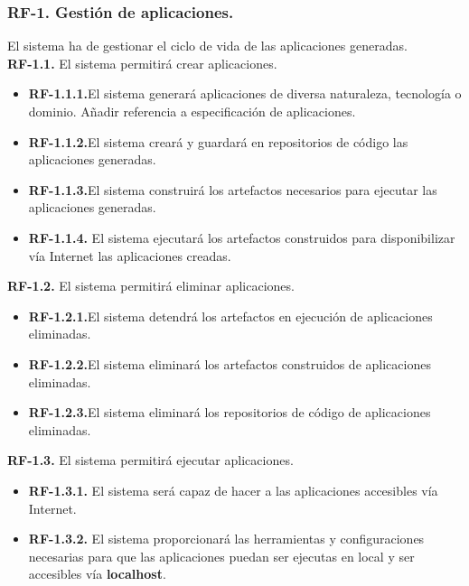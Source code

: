 \documentclass[a4paper,11pt]{book}
\begin{document}
\subsubsection { \textbf{ RF-1. Gestión de aplicaciones.}} El sistema ha de gestionar el ciclo de vida de las aplicaciones generadas.\\

\textbf{RF-1.1.} El sistema permitirá crear aplicaciones.
\begin{itemize}
 \item 	\textbf{RF-1.1.1.}El sistema generará aplicaciones de diversa naturaleza, tecnología o dominio. Añadir referencia a especificación de aplicaciones.
 \item 	\textbf{RF-1.1.2.}El sistema creará y  guardará en repositorios de código las aplicaciones generadas.
  \item \textbf{RF-1.1.3.}El sistema construirá los artefactos necesarios para ejecutar las aplicaciones generadas.
   \item  \textbf{RF-1.1.4.} El sistema ejecutará los artefactos construidos para disponibilizar vía Internet las aplicaciones creadas. \\
\end{itemize}


\textbf{RF-1.2.} El sistema permitirá eliminar aplicaciones.
\begin{itemize}
 \item 	\textbf{RF-1.2.1.}El sistema detendrá los artefactos en ejecución de aplicaciones eliminadas.
  \item 	\textbf{RF-1.2.2.}El sistema eliminará los artefactos construidos de aplicaciones eliminadas.
   \item  \textbf{RF-1.2.3.}El sistema eliminará los repositorios de código de aplicaciones eliminadas.	\\
\end{itemize}


\textbf{RF-1.3.} El sistema permitirá ejecutar aplicaciones.
\begin{itemize}
 \item \textbf{RF-1.3.1.} El sistema será capaz de hacer a las aplicaciones accesibles vía Internet.
 \item  \textbf{RF-1.3.2.} El sistema proporcionará las herramientas  y configuraciones necesarias para que las aplicaciones puedan ser ejecutas en local y ser accesibles vía \textbf{localhost}.  \\
\end{itemize}
\end{document}
